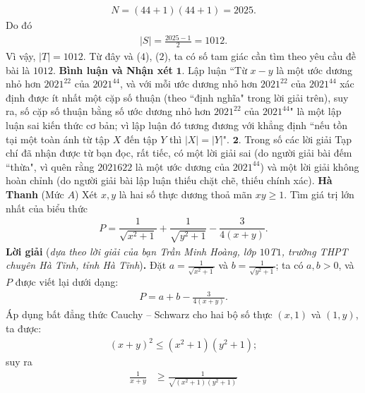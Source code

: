 \begin{multicols}{2}
\begin{align*}
		N = \left( {44 + 1} \right)\left( {44 + 1} \right) = 2025.
	\end{align*}
	Do đó
	\begin{align*}
		|S| = \frac{{2025 - 1}}{2} = 1012.
	\end{align*}
	Vì vậy,  $|T| = 1012$. Từ đây và ($4$), ($2$), ta có số tam giác cần tìm theo yêu cầu đề bài là $1012$.
	\vskip 0.05cm
	\textbf{\color{thachthuctoanhoc}Bình luận và Nhận xét}
	\vskip 0.05cm
	$\pmb{1.}$ Lập luận ``Từ $x - y$ là một ước dương nhỏ hơn $2021^{22}$  của  $2021^{44}$, và với mỗi ước dương nhỏ hơn $2021^{22}$  của $2021^{44}$  xác định được ít nhất một cặp số thuận (theo ``định nghĩa" trong lời giải trên), suy ra, số cặp số thuận bằng số ước dương nhỏ hơn $2021^{22}$  của  $2021^{44}$" là một lập luận sai kiến thức cơ bản; vì lập luận đó tương đương với khẳng định ``nếu tồn tại một toàn ánh từ tập $X$ đến tập $Y$ thì  $|X| = |Y|$".
	\vskip 0.05cm
	$\pmb{2.}$ Trong số các lời giải Tạp chí đã nhận được từ bạn đọc, rất tiếc, có một lời giải sai (do người giải bài đếm ``thừa", vì quên rằng $20216{22}$  là một ước dương của  $2021^{44}$) và một lời giải không hoàn chỉnh (do người giải bài lập luận thiếu chặt chẽ, thiếu chính xác).
	\vskip 0.05cm
	\hfill \textbf{\color{thachthuctoanhoc}Hà Thanh}
	\vskip 0.05cm
	{}
	(Mức $A$) Xét $x,y$ là hai số thực dương thoả mãn $xy\ge 1$. Tìm giá trị lớn nhất của biểu thức
	\begin{align*}
		P=\dfrac1{\sqrt{x^2+1}}+\dfrac1{\sqrt{y^2+1}}-\dfrac3{4(x+y)}.
	\end{align*}
	\textbf{\color{thachthuctoanhoc}Lời giải} (\textit{dựa theo lời giải của bạn Trần Minh Hoàng, lớp $10$T$1$, trường THPT chuyên Hà Tĩnh, tỉnh Hà Tĩnh})\textbf{\color{thachthuctoanhoc}.}
	\vskip 0.05cm
	Đặt $a = \frac{1}{{\sqrt {{x^2} + 1} }}$  và  $b = \frac{1}{{\sqrt {{y^2} + 1} }}$; ta có $a, b > 0$, và $P$ được viết lại dưới dạng:
	\begin{align*}
		P = a + b - \frac{3}{{4\left( {x + y} \right)}}. \tag{$1$}
	\end{align*}
	Áp dụng bất đẳng thức Cauchy -- Schwarz cho hai bộ số thực $(x, 1)$ và $(1, y)$, ta được:
	\begin{align*}
		{\left( {x + y} \right)^2} \le \left( {{x^2} + 1} \right)\left( {{y^2} + 1} \right);
	\end{align*}
	suy ra
	\begin{align*}
		\frac{1}{{x + y}} &\ge \frac{1}{{\sqrt {\left( {{x^2} + 1} \right)\left( {{y^2} + 1} \right)} }} \\

\end{align*}
\end{multicols}
